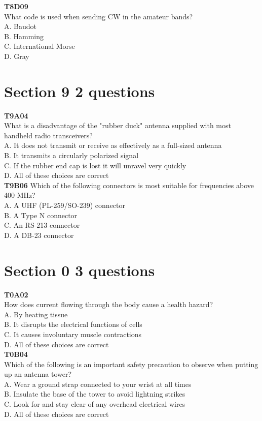 \documentclass[12pt,letterpaper,twocolumn]{report}
\begin{document}
\textbf{T8D09}\\
What code is used when sending CW in the amateur bands?\\
A. Baudot\\
B. Hamming\\
C. International Morse\\
D. Gray\\

\section{Section 9 2 questions}

\textbf{T9A04}\\
What is a disadvantage of the "rubber duck" antenna supplied with most handheld radio transceivers?\\
A. It does not transmit or receive as effectively as a full-sized antenna\\
B. It transmits a circularly polarized signal\\
C. If the rubber end cap is lost it will unravel very quickly\\
D. All of these choices are correct\\

\textbf{T9B06}
Which of the following connectors is most suitable for frequencies above 400 MHz?\\
A. A UHF (PL-259/SO-239) connector\\
B. A Type N connector\\
C. An RS-213 connector\\
D. A DB-23 connector\\


\section{Section 0 3 questions}

\textbf{T0A02}\\
How does current flowing through the body cause a health hazard?\\
A. By heating tissue\\
B. It disrupts the electrical functions of cells\\
C. It causes involuntary muscle contractions\\
D. All of these choices are correct\\

\textbf{T0B04}\\
Which of the following is an important safety precaution to observe when putting up an antenna tower?\\
A. Wear a ground strap connected to your wrist at all times\\
B. Insulate the base of the tower to avoid lightning strikes\\
C. Look for and stay clear of any overhead electrical wires\\
D. All of these choices are correct\\
\end{document}
